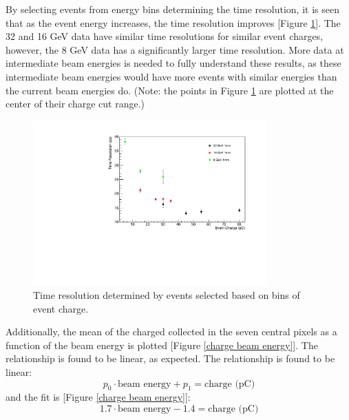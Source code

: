 \documentclass[twocolumn,aps,prd,reprint]{revtex4-1}
\begin{document}
By selecting events from energy bins determining the time resolution, it is seen that as the event energy increases, the time resolution improves [Figure \ref{time res event energy}]. The 32 and 16 GeV data have similar time resolutions for similar event charges, however, the 8 GeV data has a significantly larger time resolution. More data at intermediate beam energies is needed to fully understand these results, as these intermediate beam energies would have more events with similar energies than the current beam energies do. (Note: the points in Figure \ref{time res event energy} are plotted at the center of their charge cut range.)

\begin{figure}[!htbp]
\centering
\includegraphics[width = 0.8\textwidth]{time_res_event_energy}
\caption{Time resolution determined by events selected based on bins of event charge.}
\label{time res event energy}
\end{figure}

Additionally, the mean of the charged collected in the seven central pixels as a function of the beam energy is plotted [Figure \ref{charge beam energy}]. The relationship is found to be linear, as expected. The relationship is found to be linear:
\begin{equation}
{p_0}\cdot \text{beam energy} + p_1 = \text{charge (pC)}
\label{equation:energy charge}
\end{equation}
and the fit is [Figure \ref{charge beam energy}]:
\begin{equation}
1.7\cdot \text{beam energy} - 1.4 = \text{charge (pC)}
\label{equation:energy charge fit}
\end{equation}
\end{document}
